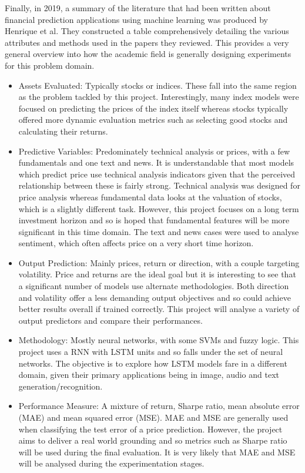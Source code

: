\documentclass[10pt,onecolumn,letterpaper]{article}
\begin{document}
Finally, in 2019, a summary of the literature\cite{Henrique} that had been written about financial prediction applications using machine learning was produced by Henrique et al. They constructed a table comprehensively detailing the various attributes and methods used in the papers they reviewed. This provides a very general overview into how the academic field is generally designing experiments for this problem domain.
\begin{itemize}
	\item Assets Evaluated: Typically stocks or indices. These fall into the same region as the problem tackled by this project. Interestingly, many index models were focused on predicting the prices of the index itself whereas stocks typically offered more dynamic evaluation metrics such as selecting good stocks and calculating their returns.
	\item Predictive Variables: Predominately technical analysis or prices, with a few fundamentals and one text and news. It is understandable that most models which predict price use technical analysis indicators given that the perceived relationship between these is fairly strong. Technical analysis was designed for price analysis whereas fundamental data looks at the valuation of stocks, which is a slightly different task. However, this project focuses on a long term investment horizon and so is hoped that fundamental features will be more significant in this time domain. The text and news cases were used to analyse sentiment, which often affects price on a very short time horizon.
	\item Output Prediction: Mainly prices, return or direction, with a couple targeting volatility. Price and returns are the ideal goal but it is interesting to see that a significant number of models use alternate methodologies. Both direction and volatility offer a less demanding output objectives and so could achieve better results overall if trained correctly. This project will analyse a variety of output predictors and compare their performances.
	\item Methodology: Mostly neural networks, with some SVMs and fuzzy logic. This project uses a RNN with LSTM units and so falls under the set of neural networks. The objective is to explore how LSTM models fare in a different domain, given their primary applications being in image, audio and text generation/recognition.
	\item Performance Measure: A mixture of return, Sharpe ratio, mean absolute error (MAE) and mean squared error (MSE). MAE and MSE are generally used when classifying the test error of a price prediction. However, the project aims to deliver a real world grounding and so metrics such as Sharpe ratio will be used during the final evaluation. It is very likely that MAE and MSE will be analysed during the experimentation stages. 
\end{itemize}
\end{document}
